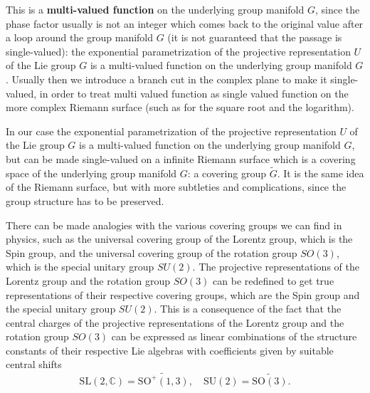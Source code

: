 This is a \textbf{multi-valued function} on the underlying group manifold \(G\), since the phase factor usually is not an integer which comes back to the original value after a loop around the group manifold \(G\) (it is not guaranteed that the passage is single-valued): the exponential parametrization of the projective representation \(U\) of the Lie group \(G\) is a multi-valued function on the underlying group manifold \(G\). Usually then we introduce a branch cut in the complex plane to make it single-valued, in order to treat multi valued function as single valued function on the more complex Riemann surface (such as for the square root and the logarithm).

In our case the exponential parametrization of the projective representation \(U\) of the Lie group \(G\) is a multi-valued function on the underlying group manifold \(G\), but can be made single-valued on a infinite Riemann surface which is a covering space of the underlying group manifold \(G\): a covering group \(\tilde{G}\). It is the same idea of the Riemann surface, but with more subtleties and complications, since the group structure has to be preserved.

There can be made analogies with the various covering groups we can find in physics, such as the universal covering group of the Lorentz group, which is the Spin group, and the universal covering group of the rotation group \(SO(3)\), which is the special unitary group \(SU(2)\). The projective representations of the Lorentz group and the rotation group \(SO(3)\) can be redefined to get true representations of their respective covering groups, which are the Spin group and the special unitary group \(SU(2)\). This is a consequence of the fact that the central charges of the projective representations of the Lorentz group and the rotation group \(SO(3)\) can be expressed as linear combinations of the structure constants of their respective Lie algebras with coefficients given by suitable central shifts
\[
    \mathrm{SL}(2, \mathbb{C}) = \widetilde{\mathrm{SO}^+(1,3)}, \quad \mathrm{SU}(2) = \widetilde{\mathrm{SO}(3)}.
\]